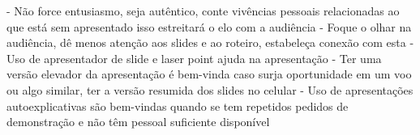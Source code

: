 \begin{itemize}
- Não force entusiasmo, seja autêntico, conte vivências pessoais relacionadas ao que está sem apresentado isso estreitará o elo com a audiência
- Foque o olhar na audiência, dê menos atenção aos slides e ao roteiro, estabeleça conexão com esta
- Uso de apresentador de slide e laser point ajuda na apresentação
- Ter uma versão elevador da apresentação é bem-vinda caso surja oportunidade em um voo ou algo similar, ter a versão resumida dos slides no celular
- Uso de apresentações autoexplicativas são bem-vindas quando se tem repetidos pedidos de demonstração e não têm pessoal suficiente disponível

\end{itemize}



